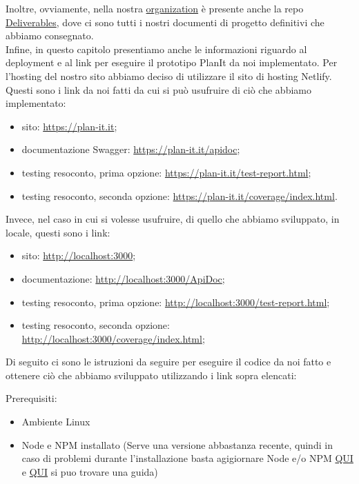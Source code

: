 Inoltre, ovviamente, nella nostra \href{https://github.com/orgs/Life-planner/repositories}{organization} è presente anche la repo \href{https://github.com/Life-planner/Deliverables}{Deliverables}, dove ci sono tutti i nostri documenti di progetto definitivi che abbiamo consegnato. \\
Infine, in questo capitolo presentiamo anche le informazioni riguardo al deployment e al link per eseguire il prototipo PlanIt da noi implementato. Per l'hosting del nostro sito abbiamo deciso di utilizzare il sito di hosting Netlify. \\ Questi sono i link da noi fatti da cui si può usufruire di ciò che abbiamo implementato:
\begin{itemize}
    \item sito: \url{https://plan-it.it};
    \item documentazione Swagger: \url{https://plan-it.it/apidoc};
    \item testing resoconto, prima opzione: \url{https://plan-it.it/test-report.html};
    \item testing resoconto, seconda opzione: \url{https://plan-it.it/coverage/index.html}.
\end{itemize}

Invece, nel caso in cui si volesse usufruire, di quello che abbiamo sviluppato, in locale, questi sono i link:

\begin{itemize}
    \item sito: \url{http://localhost:3000};
    \item documentazione: \url{http://localhost:3000/ApiDoc};
    \item testing resoconto, prima opzione: \url{http://localhost:3000/test-report.html};
    \item testing resoconto, seconda opzione: \url{http://localhost:3000/coverage/index.html};

\end{itemize}

Di seguito ci sono le istruzioni da seguire per eseguire il codice da noi fatto e ottenere ciò che abbiamo sviluppato utilizzando i link sopra elencati:

Prerequisiti:
\begin{itemize}
    \item Ambiente Linux
    \item Node e NPM installato (Serve una versione abbastanza recente, quindi in caso di problemi durante l'installazione basta agigiornare Node e/o NPM \href{https://www.freecodecamp.org/news/how-to-update-node-and-npm-to-the-latest-version/}{QUI} e \href{https://docs.npmjs.com/try-the-latest-stable-version-of-npm}{QUI} si puo trovare una guida)
\end{itemize}

